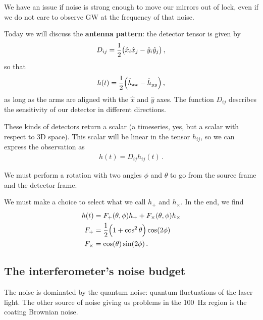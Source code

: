 \documentclass[main.tex]{subfiles}
\begin{document}

We have an issue if noise is strong enough to move our mirrors out of lock, even if we do not care to observe GW at the frequency of that noise.

Today we will discuss the \textbf{antenna pattern}: the detector tensor is given by 
%
\begin{align}
D_{ij} = \frac{1}{2} \qty(\hat{x}_{i} \hat{x}_{j} - \hat{y}_{i} \hat{y}_{j}) 
\,,
\end{align}
%
so that 
%
\begin{align}
h(t) = \frac{1}{2} \qty(\ddot{h}_{xx} - \ddot{h}_{yy})
\,,
\end{align}
%
as long as the arms are aligned with the \(\hat{x}\) and \(\hat{y}\) axes. 
The function \(D_{ij}\) describes the sensitivity of our detector in different directions. 

These kinds of detectors return a scalar (a timeseries, yes, but a scalar with respect to 3D space). This scalar will be linear in the tensor \(h_{ij}\), so we can express the observation as 
%
\begin{align}
h(t) = D_{ij} h_{ij} (t)
\,.
\end{align}

We must perform a rotation with two angles \(\phi \) and \(\theta \) to go from the source frame and the detector frame. 

We must make a choice to select what we call \(h_{+}\) and \(h_{ \times }\). In the end, we find 
%
\begin{subequations}
\begin{align}
h(t) &= F_{+} (\theta , \phi ) h_{+}+ F_{\times} (\theta , \phi ) h_{\times}  \\
F_{+} &= \frac{1}{2} \qty(1 + \cos^2\theta ) \cos( 2 \phi )  \\
F_{ \times } &= \cos(\theta ) \sin(2 \phi )
\,.
\end{align}
\end{subequations}

\subsection{The interferometer's noise budget}

The noise is dominated by the quantum noise: quantum fluctuations of the laser light. 
The other source of noise giving us problems in the \SI{100}{Hz} region is the coating Brownian noise. 
\end{document}
